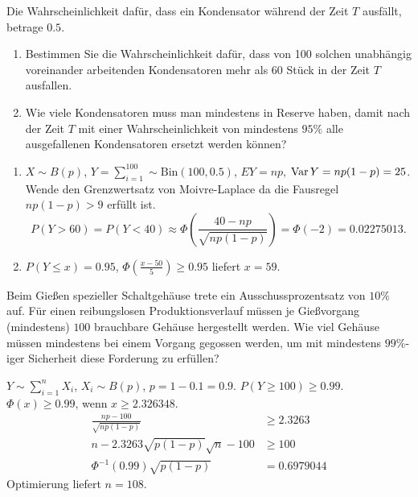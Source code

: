  Die Wahrscheinlichkeit dafür,
dass ein Kondensator während der Zeit $T$ ausfällt, betrage $0.5$. 
\begin{enumerate}
    \item Bestimmen Sie die Wahrscheinlichkeit dafür, dass von 100 solchen
        unabhängig voreinander arbeitenden Kondensatoren mehr als $60$ Stück in
        der Zeit $T$ ausfallen. 
    \item Wie viele Kondensatoren muss man mindestens in Reserve haben, damit
        nach der Zeit $T$ mit einer Wahrscheinlichkeit von mindestens $95\%$
        alle ausgefallenen Kondensatoren ersetzt werden können?
\end{enumerate}

\solution 
\begin{enumerate}
    \item $X\sim B(p)$, $Y=\sum_{i=1}^{100} \sim \text{Bin}(100,0.5)$, $E Y =
        np$, $\operatorname{Var} Y = np(1-p)= 25$. Wende den Grenzwertsatz von Moivre-Laplace
        da die Fausregel $np(1-p)>9$ erfüllt ist.
        \begin{equation*}
            P(Y>60) = P(Y < 40) \approx 
            \Phi\left( \frac{40 - np}{ \sqrt{np(1-p)}} \right) =
            \Phi(-2) = 0.02275013.
        \end{equation*}

    \item $P(Y \leq x) = 0.95$, $\Phi\left( \frac{x-50}{5} \right) \geq 0.95$
        liefert $x=59$. 
\end{enumerate}

 Beim Gießen spezieller
Schaltgehäuse trete ein Ausschussprozentsatz von $10\%$ auf. Für einen
reibungslosen Produktionsverlauf müssen je Gießvorgang (mindestens) $100$
brauchbare Gehäuse hergestellt werden.  Wie viel Gehäuse müssen mindestens bei
einem Vorgang gegossen werden, um mit mindestens $99\%$-iger Sicherheit diese
Forderung zu erfüllen?

\solution $Y\sim \sum_{i=1}^{n} X_i$, $X_i \sim B(p)$,
$p=1-0.1=0.9$.  $P(Y\geq 100) \geq 0.99$. $\Phi(x) \geq 0.99$, wenn $x\geq
2.326348$. 
\begin{align*}
    \frac{np - 100}{ \sqrt{np(1-p)} } &\geq 2.3263 \\
    n - 2.3263 \sqrt{p(1-p)} \sqrt{n} -100 &\geq 100 \\
    \Phi^{-1}(0.99) \sqrt{p(1-p)} &= 0.6979044
\end{align*}
Optimierung liefert $n=108$.

